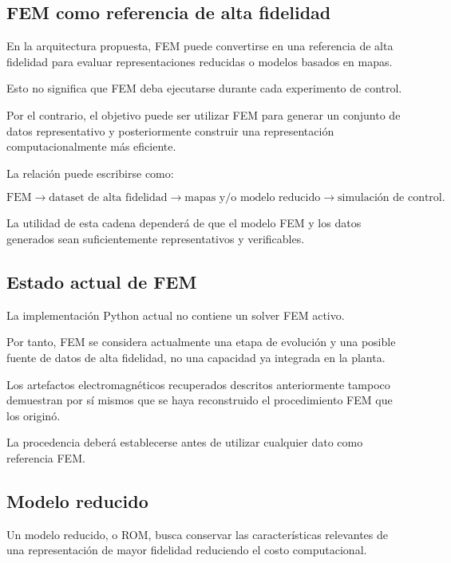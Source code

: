 \subsection{FEM como referencia de alta fidelidad}

En la arquitectura propuesta, FEM puede convertirse en una referencia de alta fidelidad para evaluar representaciones reducidas o modelos basados en mapas.

Esto no significa que FEM deba ejecutarse durante cada experimento de control.

Por el contrario, el objetivo puede ser utilizar FEM para generar un conjunto de datos representativo y posteriormente construir una representación computacionalmente más eficiente.

La relación puede escribirse como:

\begin{equation}
\mathrm{FEM}
\rightarrow
\text{dataset de alta fidelidad}
\rightarrow
\text{mapas y/o modelo reducido}
\rightarrow
\text{simulación de control}.
\end{equation}

La utilidad de esta cadena dependerá de que el modelo FEM y los datos generados sean suficientemente representativos y verificables.

\subsection{Estado actual de FEM}

La implementación Python actual no contiene un solver FEM activo.

Por tanto, FEM se considera actualmente una etapa de evolución y una posible fuente de datos de alta fidelidad, no una capacidad ya integrada en la planta.

Los artefactos electromagnéticos recuperados descritos anteriormente tampoco demuestran por sí mismos que se haya reconstruido el procedimiento FEM que los originó.

La procedencia deberá establecerse antes de utilizar cualquier dato como referencia FEM.

\subsection{Modelo reducido}

Un modelo reducido, o ROM, busca conservar las características relevantes de una representación de mayor fidelidad reduciendo el costo computacional.

